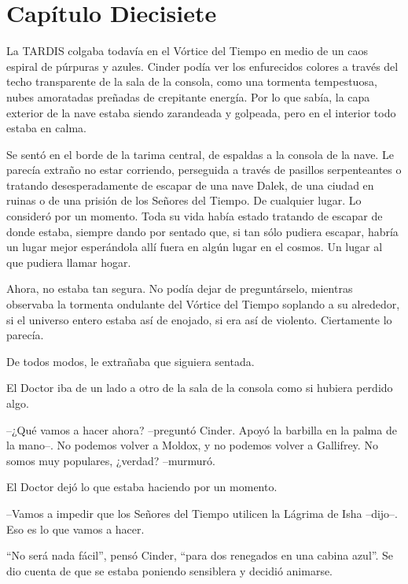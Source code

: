 \chapter*{Capítulo Diecisiete}




La TARDIS colgaba todavía en el Vórtice del Tiempo en medio de un caos espiral de púrpuras y azules. Cinder podía ver los enfurecidos colores a través del techo transparente de la sala de la consola, como una tormenta tempestuosa, nubes amoratadas preñadas de crepitante energía. Por lo que sabía, la capa exterior de la nave estaba siendo zarandeada y golpeada, pero en el interior todo estaba en calma.

Se sentó en el borde de la tarima central, de espaldas a la consola de la nave. Le parecía extraño no estar corriendo, perseguida a través de pasillos serpenteantes o tratando desesperadamente de escapar de una nave Dalek, de una ciudad en ruinas o de una prisión de los Señores del Tiempo. De cualquier lugar. Lo consideró por un momento. Toda su vida había estado tratando de escapar de donde estaba, siempre dando por sentado que, si tan sólo pudiera escapar, habría un lugar mejor esperándola allí fuera en algún lugar en el cosmos. Un lugar al que pudiera llamar hogar.

Ahora, no estaba tan segura. No podía dejar de preguntárselo, mientras observaba la tormenta ondulante del Vórtice del Tiempo soplando a su alrededor, si el universo entero estaba así de enojado, si era así de violento. Ciertamente lo parecía.

De todos modos, le extrañaba que siguiera sentada.

El Doctor iba de un lado a otro de la sala de la consola como si hubiera perdido algo.



--¿Qué vamos a hacer ahora? --preguntó Cinder. Apoyó la barbilla en la palma de la mano--. No podemos volver a Moldox, y no podemos volver a Gallifrey. No somos muy populares, ¿verdad? --murmuró.



El Doctor dejó lo que estaba haciendo por un momento. 



--Vamos a impedir que los Señores del Tiempo utilicen la Lágrima de Isha --dijo--. Eso es lo que vamos a hacer.



``No será nada fácil'', pensó Cinder, ``para dos renegados en una cabina azul''. Se dio cuenta de que se estaba poniendo sensiblera y decidió animarse. 



